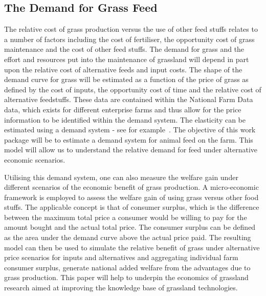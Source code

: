 \documentclass{report}
\begin{document}
\subsection{The Demand for Grass Feed}
The relative cost of grass production versus the use of other feed stuffs relates to a number of factors including the cost of fertiliser, the opportunity cost of grass maintenance and the cost of other feed stuffs. The demand for grass and the effort and resources put into the maintenance of grassland will depend in part upon the relative cost of alternative feeds and input costs. The shape of the demand curve for grass will be estimated as a function of the price of grass as defined by the cost of inputs, the opportunity cost of time and the relative cost of alternative feedstuffs. These data are contained within the National Farm Data data, which exists for different enterprise farms and thus allow for the price information to be identified within the demand system. The elasticity can be estimated using a demand system - see for example~\citep{deaton80}. The objective of this work package will be to estimate a demand system for animal feed on the farm. This model will allow us to understand the relative demand for feed under alternative economic scenarios.

Utilising this demand system, one can also measure the welfare gain under different scenarios of the economic benefit of grass production. A micro-economic framework is employed to assess the welfare gain of using grass versus other food stuffs. The applicable concept  is that of consumer surplus, which is the difference between the maximum total price a consumer would be willing to pay for the amount bought and the actual total price. The consumer surplus can be defined as the area under the demand curve above the actual price paid. The resulting model can then be used to simulate the relative benefit of grass under alternative price scenarios for inputs and alternatives and aggregating individual farm consumer surplus, generate national added welfare from the advantages due to grass production. This paper will help to underpin the economics of grassland research aimed at improving the knowledge base of grassland technologies.
\end{document}
